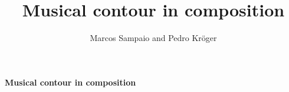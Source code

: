 \documentclass[12pt]{article}
\begin{document}
\title{Musical contour in composition} 
\author{Marcos Sampaio and Pedro Kröger}

\begin{center}
  \Large \textbf{\textsf{Musical contour in composition}}
\end{center}


\thispagestyle{empty}

\doublespacing


\singlespacing



\end{document}
